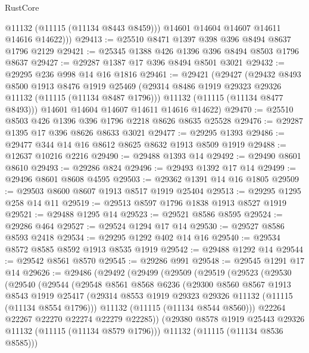 \begin{lexlean}{RustCore}
\begin{coremodule}
            @11132
            (@11115 (@11134 @8443 @8459)))
          @14601
          @14604
          @14607
          @14611
          @14616
          @14622)))
@29413 := @25510 @8471 @1397 @398 @396 @8494 @8637 @1796 @2129
@29421 := @25345 @1388 @426 @1396 @396 @8494 @8503 @1796 @8637
@29427 := @29287 @1387 @17 @396 @8494 @8501 @3021
@29432 := @29295 @236 @998 @14 @16 @1816
@29461 := @29421
    (@29427
      (@29432
        @8493
        @8500
        @1913
        @8476
        @1919
        @25469
        (@29314 @8486 @1919 @29323 @29326 @11132 (@11115 (@11134 @8487 @1796)))
        @11132
        (@11115 (@11134 @8477 @8493)))
      @14601
      @14604
      @14607
      @14611
      @14616
      @14622)
@29470 := @25510 @8503 @426 @1396 @396 @1796 @2218 @8626 @8635 @25528
@29476 := @29287 @1395 @17 @396 @8626 @8633 @3021
@29477 := @29295 @1393
@29486 := @29477 @344 @14 @16 @8612 @8625 @8632 @1913 @8509 @1919
@29488 := @12637 @10216 @2216
@29490 := @29488 @1393 @14
@29492 := @29490 @8601 @8610
@29493 := @29286 @824
@29496 := @29493 @1392 @17 @14
@29499 := @29496 @8601 @8608 @4595
@29503 := @29362 @1391 @14 @16 @1805
@29509 := @29503 @8600 @8607 @1913 @8517 @1919 @25404
@29513 := @29295 @1295 @258 @14 @11
@29519 := @29513 @8597 @1796 @1838 @1913 @8527 @1919
@29521 := @29488 @1295 @14
@29523 := @29521 @8586 @8595
@29524 := @29286 @464
@29527 := @29524 @1294 @17 @14
@29530 := @29527 @8586 @8593 @2418
@29534 := @29295 @1292 @402 @14 @16
@29540 := @29534 @8572 @8585 @8592 @1913 @8535 @1919
@29542 := @29488 @1292 @14
@29544 := @29542 @8561 @8570
@29545 := @29286 @991
@29548 := @29545 @1291 @17 @14
@29626 := @29486
    (@29492
      (@29499
        (@29509
          (@29519
            (@29523
              (@29530
                (@29540
                  (@29544
                    (@29548
                      @8561
                      @8568
                      @6236
                      (@29300
                        @8560
                        @8567
                        @1913
                        @8543
                        @1919
                        @25417
                        (@29314 @8553 @1919 @29323 @29326 @11132 (@11115 (@11134 @8554 @1796)))
                        @11132
                        (@11115 (@11134 @8544 @8560)))
                      @22264
                      @22267
                      @22270
                      @22274
                      @22279
                      @22285))
                  (@29380 @8578 @1919 @25443 @29326 @11132 (@11115 (@11134 @8579 @1796)))
                  @11132
                  (@11115 (@11134 @8536 @8585)))

\end{coremodule}
\end{lexlean}
